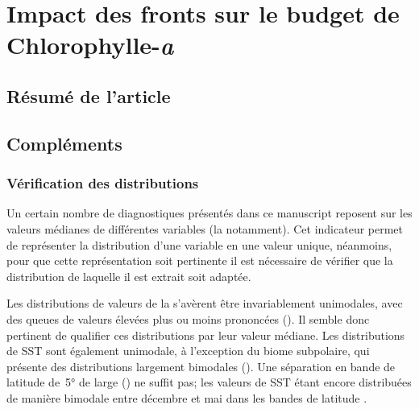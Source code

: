 
\chapter{Impact des fronts sur le budget de Chlorophylle-\textit{a}}
\addChpLof
\label{chp:res-chl}
\graphicspath{{resources/res_chl}}

\minitoc%


\section{Résumé de l'article}
\label{sec:resume-article}


\insertArticle{}

\section{Compléments}
\label{sec:complements-chl}
\suppressfloats[t]

\subsection{Vérification des distributions}
\label{sec:verif-hist}

Un certain nombre de diagnostiques présentés dans ce manuscript reposent sur les valeurs médianes de différentes variables (la  notamment).
Cet indicateur permet de représenter la distribution d'une variable en une valeur unique, néanmoins, pour que cette représentation soit pertinente il est nécessaire de vérifier que la distribution de laquelle il est extrait soit adaptée.

Les distributions de valeurs de la  s'avèrent être invariablement unimodales, avec des queues de valeurs élevées plus ou moins prononcées ().
Il semble donc pertinent de qualifier ces distributions par leur valeur médiane.
Les distributions de SST sont également unimodale, à l'exception du biome subpolaire, qui présente des distributions largement bimodales ().
Une séparation en bande de latitude de~\ang{5} de large () ne suffit pas; les valeurs de SST étant encore distribuées de manière bimodale entre décembre et mai dans les bandes de latitude .

